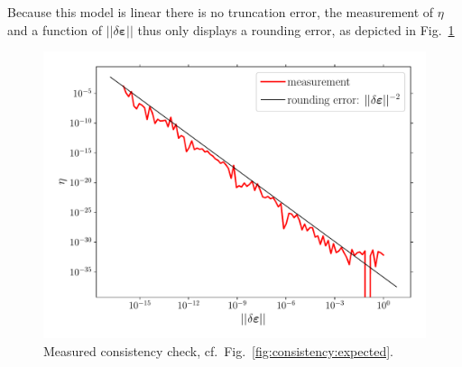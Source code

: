 \documentclass[garamond]{goose-article}
\begin{document}
Because this model is linear there is no truncation error, the measurement of $\eta$ and a function of $|| \delta \bm{\varepsilon} ||$ thus only displays a rounding error, as depicted in Fig.~\ref{fig:consistency}

\begin{figure}[htp]
  \centering
  \includegraphics[width=.5\textwidth]{examples/consistency}
  \caption{Measured consistency check, cf.\ Fig.~\ref{fig:consistency:expected}.}
  \label{fig:consistency}
\end{figure}


\end{document}
